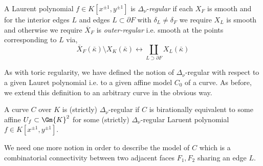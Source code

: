 \begin{defn}
A Laurent polynomial $f \in K[x^{\pm 1}, y^{\pm 1}]$ is $\Delta_\nu$-\textit{regular} if each $X_F$ is smooth and for the interior edges $L$ and edges $L \subset \partial F$ with $\delta_L \neq \delta_F$ we require $X_L$ is smooth and otherwise we require $\overline{X}_F$ is \textit{outer-regular} i.e. smooth at the points corresponding to $L$ via,
\[ \overline{X}_F(\bar{\kappa}) \setminus X_K(\bar{\kappa}) \longleftrightarrow \coprod_{L \supset \partial F} X_L(\bar{\kappa}) \]
\end{defn}

\begin{rmk}
As with toric regularity, we have defined the notion of $\Delta_\nu$-regular with respect to a given Lauret polynomial i.e. to a given affine model $C_0$ of a curve. As before, we extend this definition to an arbitrary curve in the obvious way.
\end{rmk}

\begin{defn}
A curve $C$ over $K$ is (strictly) $\Delta_\nu$-regular if $C$ is birationally equivalent to some affine $U_f \subset \Gm{K}^2$ for some (strictly) $\Delta_\nu$-regular Laruent polynomial $f \in K[x^{\pm 1}, y^{\pm 1}]$. 
\end{defn}

\begin{rmk}
We need one more notion in order to describe the model of $C$ which is a combinatorial connectivity between two adjacent faces $F_1, F_2$ sharing an edge $L$. 
\end{rmk}

